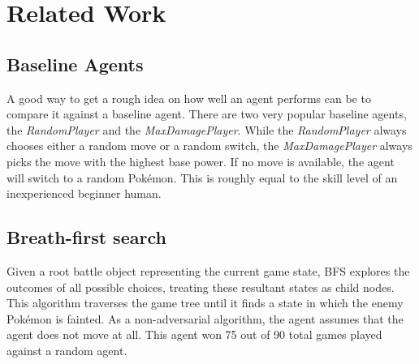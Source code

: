 
\chapter{Related Work}
\label{ch:relatedwork}

\section{Baseline Agents}
\label{sec:eval-challenges-baseline}
A good way to get a rough idea on how well an agent performs can be to compare it against a baseline agent.
There are two very popular baseline agents, the \textit{RandomPlayer} and the \textit{MaxDamagePlayer}.
While the \textit{RandomPlayer} always chooses either a random move or a random switch, the \textit{MaxDamagePlayer}
always picks the move with the highest base power. If no move is available, the agent will switch to a random 
Pokémon. This is roughly equal to the skill level of an inexperienced beginner human. 

\section{Breath-first search}
\label{sec:related-bfs}
Given a root battle object representing the current game state, \ac{BFS} explores the outcomes of all possible choices,
treating these resultant states as child nodes. This algorithm traverses the game tree until it finds a state in which
the enemy Pokémon is fainted. As a non-adversarial algorithm, the agent assumes that the agent does not move at all.
This agent won 75 out of 90 total games played against a random agent\cite{Lee_Togelius_2017}.


